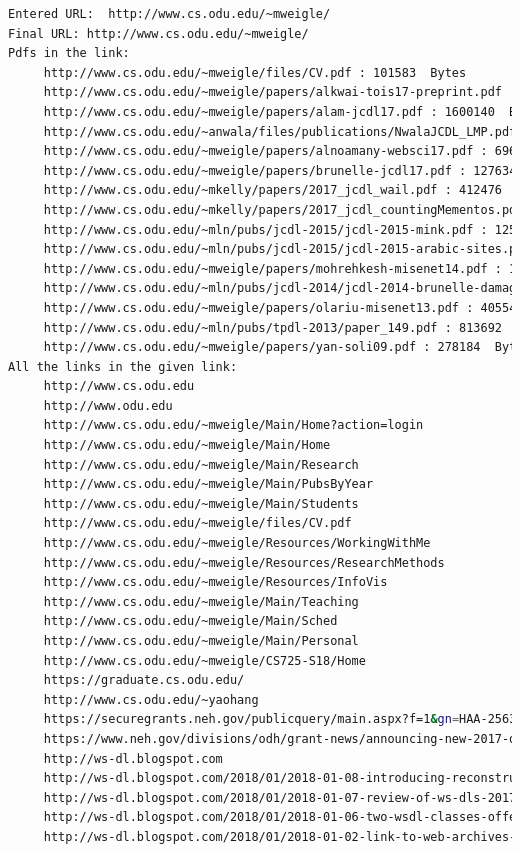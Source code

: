 \documentclass[a4paper, 11pt]{article}
\begin{document}
\begin{lstlisting}[language=bash,label=Output:,caption=Output:]
Entered URL:  http://www.cs.odu.edu/~mweigle/
Final URL: http://www.cs.odu.edu/~mweigle/
Pdfs in the link:
	 http://www.cs.odu.edu/~mweigle/files/CV.pdf : 101583  Bytes
	 http://www.cs.odu.edu/~mweigle/papers/alkwai-tois17-preprint.pdf : 1430568  Bytes
	 http://www.cs.odu.edu/~mweigle/papers/alam-jcdl17.pdf : 1600140  Bytes
	 http://www.cs.odu.edu/~anwala/files/publications/NwalaJCDL_LMP.pdf : 17623699  Bytes
	 http://www.cs.odu.edu/~mweigle/papers/alnoamany-websci17.pdf : 6962016  Bytes
	 http://www.cs.odu.edu/~mweigle/papers/brunelle-jcdl17.pdf : 1276346  Bytes
	 http://www.cs.odu.edu/~mkelly/papers/2017_jcdl_wail.pdf : 412476  Bytes
	 http://www.cs.odu.edu/~mkelly/papers/2017_jcdl_countingMementos.pdf : 274265  Bytes
	 http://www.cs.odu.edu/~mln/pubs/jcdl-2015/jcdl-2015-mink.pdf : 1254605  Bytes
	 http://www.cs.odu.edu/~mln/pubs/jcdl-2015/jcdl-2015-arabic-sites.pdf : 709420  Bytes
	 http://www.cs.odu.edu/~mweigle/papers/mohrehkesh-misenet14.pdf : 1231147  Bytes
	 http://www.cs.odu.edu/~mln/pubs/jcdl-2014/jcdl-2014-brunelle-damage.pdf : 2205546  Bytes
	 http://www.cs.odu.edu/~mweigle/papers/olariu-misenet13.pdf : 405542  Bytes
	 http://www.cs.odu.edu/~mln/pubs/tpdl-2013/paper_149.pdf : 813692  Bytes
	 http://www.cs.odu.edu/~mweigle/papers/yan-soli09.pdf : 278184  Bytes
All the links in the given link:
	 http://www.cs.odu.edu
	 http://www.odu.edu
	 http://www.cs.odu.edu/~mweigle/Main/Home?action=login
	 http://www.cs.odu.edu/~mweigle/Main/Home
	 http://www.cs.odu.edu/~mweigle/Main/Research
	 http://www.cs.odu.edu/~mweigle/Main/PubsByYear
	 http://www.cs.odu.edu/~mweigle/Main/Students
	 http://www.cs.odu.edu/~mweigle/files/CV.pdf
	 http://www.cs.odu.edu/~mweigle/Resources/WorkingWithMe
	 http://www.cs.odu.edu/~mweigle/Resources/ResearchMethods
	 http://www.cs.odu.edu/~mweigle/Resources/InfoVis
	 http://www.cs.odu.edu/~mweigle/Main/Teaching
	 http://www.cs.odu.edu/~mweigle/Main/Sched
	 http://www.cs.odu.edu/~mweigle/Main/Personal
	 http://www.cs.odu.edu/~mweigle/CS725-S18/Home
	 https://graduate.cs.odu.edu/
	 http://www.cs.odu.edu/~yaohang
	 https://securegrants.neh.gov/publicquery/main.aspx?f=1&gn=HAA-256368-17
	 https://www.neh.gov/divisions/odh/grant-news/announcing-new-2017-odh-grant-awards
	 http://ws-dl.blogspot.com
	 http://ws-dl.blogspot.com/2018/01/2018-01-08-introducing-reconstructive.html
	 http://ws-dl.blogspot.com/2018/01/2018-01-07-review-of-ws-dls-2017.html
	 http://ws-dl.blogspot.com/2018/01/2018-01-06-two-wsdl-classes-offered-for.html
	 http://ws-dl.blogspot.com/2018/01/2018-01-02-link-to-web-archives-not.html

\end{lstlisting}
\end{document}
